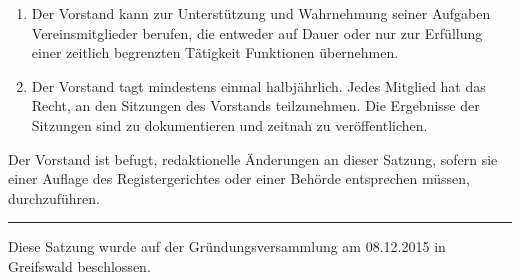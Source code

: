 \documentclass[parskip=half]{scrartcl}
\begin{document}
\begin{contract}
\begin{enumerate}
\begin{enumerate}
				\item Der Vorstand kann zur Unterstützung und Wahrnehmung seiner Aufgaben Vereinsmitglieder berufen, die entweder auf Dauer oder nur zur Erfüllung einer zeitlich begrenzten Tätigkeit Funktionen übernehmen.
				\item Der Vorstand tagt mindestens einmal halbjährlich. Jedes Mitglied hat das Recht, an den Sitzungen des Vorstands teilzunehmen. Die Ergebnisse der Sitzungen sind zu dokumentieren und zeitnah zu veröffentlichen.
			\end{enumerate}
		\end{enumerate}
		Der Vorstand ist befugt, redaktionelle Änderungen an dieser Satzung, sofern sie einer Auflage des Registergerichtes oder einer Behörde entsprechen müssen, durchzuführen.
	\end{contract}
	\bigskip
	\hrule\bigskip
	Diese Satzung wurde auf der Gründungsversammlung am 08.12.2015 in Greifswald beschlossen.\vspace{2cm}
\end{document}
